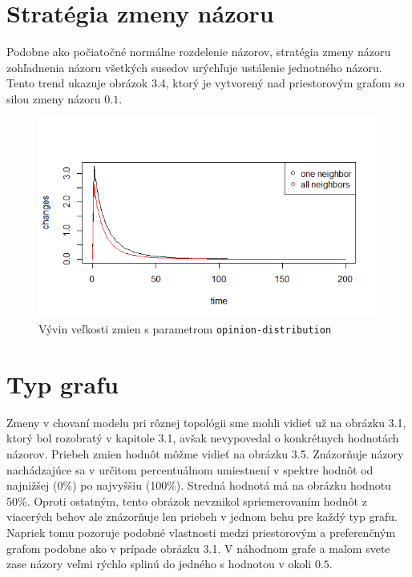 \documentclass[10pt,a4paper]{report}
\begin{document}
\section{Stratégia zmeny názoru}
Podobne ako počiatočné normálne rozdelenie názorov, stratégia zmeny názoru zohľadnenia názoru všetkých susedov urýchľuje ustálenie jednotného názoru. Tento trend ukazuje obrázok 3.4, ktorý je vytvorený nad priestorovým grafom so silou zmeny názoru $0.1$.  
\begin{figure}
  \includegraphics[width=\textwidth]{plots/random-g/randomAllVsOne.png}
  \caption{Vývin veľkosti zmien s parametrom \texttt{opinion-distribution} }
\end{figure}

\section{Typ grafu}
Zmeny v chovaní modelu pri rôznej topológii sme mohli vidieť už na obrázku 3.1, ktorý bol rozobratý v kapitole 3.1, avšak nevypovedal o konkrétnych hodnotách názorov. Priebeh zmien hodnôt môžme vidieť na obrázku 3.5. Znázorňuje názory nachádzajúce sa v určitom percentuálnom umiestnení v spektre hodnôt od najnižšej (0\%) po najvyššiu (100\%). Stredná hodnotá má na obrázku hodnotu 50\%. Oproti ostatným, tento obrázok nevznikol spriemerovaním hodnôt z viacerých behov ale znázorňuje len priebeh v jednom behu pre každý typ grafu. Napriek tomu pozoruje podobné vlastnosti medzi priestorovým a preferenčným grafom podobne ako v prípade obrázku 3.1. V náhodnom grafe a malom svete zase názory veľmi rýchlo splinú do jedného s hodnotou v okoli $0.5$.
\end{document}
